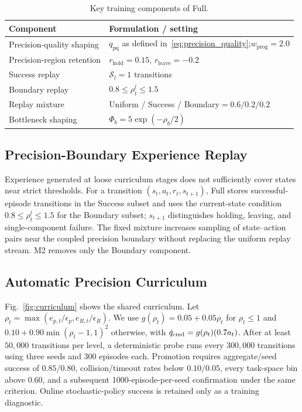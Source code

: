 \documentclass[conference]{IEEEtran}
\begin{document}
\begin{table}[H]
\caption{Key training components of Full.}
\label{tab:fullcomponents}
\centering
\begingroup
\setlength{\tabcolsep}{4pt}
\renewcommand{\arraystretch}{1.12}
\begin{tabular}{@{}>{\raggedright\arraybackslash}p{}|>{\raggedright\arraybackslash}p{}@{}}
\hline
Component & Formulation / setting\\
\hline
Precision-quality shaping & $q_{\mathrm{pq}}$ as defined in~\eqref{eq:precision_quality};\newline $w_{\mathrm{prog}}=2.0$\\
Precision-region retention & $r_{\mathrm{hold}}=0.15$, $r_{\mathrm{leave}}=-0.2$\\
Success replay & $\mathcal{S}_l=1$ transitions\\
Boundary replay & $0.8\leq\rho_t^l\leq1.5$\\
Replay mixture & Uniform / Success / Boundary\newline $=0.6/0.2/0.2$\\
Bottleneck shaping & $\Phi_b=5\exp(-\rho_b/2)$\\
\hline
\end{tabular}
\endgroup
\end{table}

\subsection{Precision-Boundary Experience Replay}
Experience generated at loose curriculum stages does not sufficiently cover states near strict thresholds. For a transition $(s_t,a_t,r_t,s_{t+1})$, Full stores successful-episode transitions in the Success subset and uses the current-state condition $0.8\leq\rho_t^l\leq1.5$ for the Boundary subset; $s_{t+1}$ distinguishes holding, leaving, and single-component failure. The fixed mixture increases sampling of state--action pairs near the coupled precision boundary without replacing the uniform replay stream. M2 removes only the Boundary component.

\subsection{Automatic Precision Curriculum}
Fig.~\ref{fig:curriculum} shows the shared curriculum. Let $\rho_t=\max(e_{p,t}/\epsilon_p,e_{R,t}/\epsilon_R)$. We use $g(\rho_t)=0.05+0.05\rho_t$ for $\rho_t\leq1$ and $0.10+0.90\min(\rho_t-1,1)^2$ otherwise, with $\dot q_{\rm cmd}=g(\rho_t)(0.7a_t)$. After at least $50{,}000$ transitions per level, a deterministic probe runs every $300{,}000$ transitions using three seeds and 300 episodes each. Promotion requires aggregate/seed success of $0.85/0.80$, collision/timeout rates below $0.10/0.05$, every task-space bin above $0.60$, and a subsequent 1000-episode-per-seed confirmation under the same criterion. Online stochastic-policy success is retained only as a training diagnostic.
\end{document}
